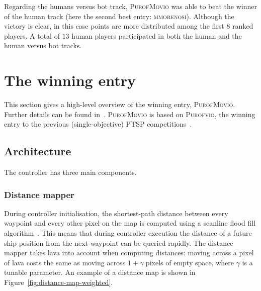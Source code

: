 \documentclass[conference]{IEEEtran}
\begin{document}
Regarding the humans versus bot track, \textsc{PurofMovio} was able to beat the winner of the human track (here the second best entry: \textsc{mmorenosi}). Although the victory is clear, in this case points are more distributed among the first $8$ ranked players. A total of $13$ human players participated in both the human and the human versus bot tracks.

\section{The winning entry} \label{sec:purofmovio}

This section gives a high-level overview of the winning entry, \textsc{PurofMovio}.
Further details can be found in~\cite{Powley2013_moptsp}.
\textsc{PurofMovio} is based on \textsc{Purofvio}, the winning entry to the previous (single-objective) PTSP competitions~\cite{Powley2012,Perez2013}.

\subsection{Architecture}

The controller has three main components.

\subsubsection{Distance mapper}
During controller initialisation, the shortest-path distance between every waypoint and every other pixel on the map is computed
using a scanline flood fill algorithm~\cite{Lieberman1978}.
This means that during controller execution
the distance of a future ship position from the next waypoint can be queried rapidly.
The distance mapper takes lava into account when computing distances:
moving across a pixel of lava costs the same as moving across $1+\gamma$ pixels of empty space,
where $\gamma$ is a tunable parameter.
An example of a distance map is shown in Figure~\ref{fig:distance-map-weighted}.
\end{document}
